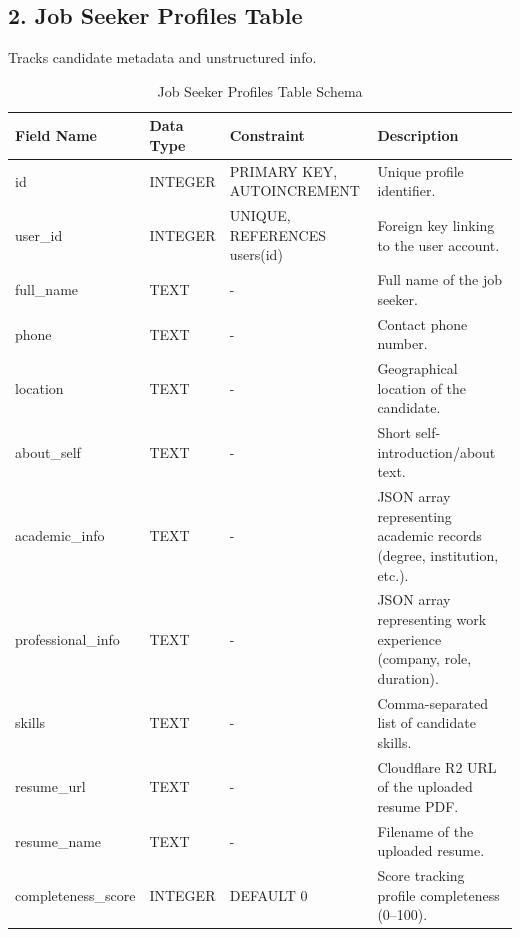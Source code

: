 \documentclass[12pt,a4paper]{report}
\begin{document}
\newpage 

\subsection{2. Job Seeker Profiles Table}
Tracks candidate metadata and unstructured info.
\begin{table}[H]
\centering
\small
\begin{tabular}{|p{2.8cm}|p{2.0cm}|p{2.5cm}|p{6.7cm}|}
\hline
\textbf{Field Name} & \textbf{Data Type} & \textbf{Constraint} & \textbf{Description} \\ \hline
id & INTEGER & PRIMARY KEY, AUTOINCREMENT & Unique profile identifier. \\ \hline
user\_id & INTEGER & UNIQUE, REFERENCES users(id) & Foreign key linking to the user account. \\ \hline
full\_name & TEXT & - & Full name of the job seeker. \\ \hline
phone & TEXT & - & Contact phone number. \\ \hline
location & TEXT & - & Geographical location of the candidate. \\ \hline
about\_self & TEXT & - & Short self-introduction/about text. \\ \hline
academic\_info & TEXT & - & JSON array representing academic records (degree, institution, etc.). \\ \hline
professional\_info & TEXT & - & JSON array representing work experience (company, role, duration). \\ \hline
skills & TEXT & - & Comma-separated list of candidate skills. \\ \hline
resume\_url & TEXT & - & Cloudflare R2 URL of the uploaded resume PDF. \\ \hline
resume\_name & TEXT & - & Filename of the uploaded resume. \\ \hline
completeness\_score & INTEGER & DEFAULT 0 & Score tracking profile completeness (0--100). \\ \hline
\end{tabular}
\caption{Job Seeker Profiles Table Schema}
\end{table}

\newpage
\end{document}
